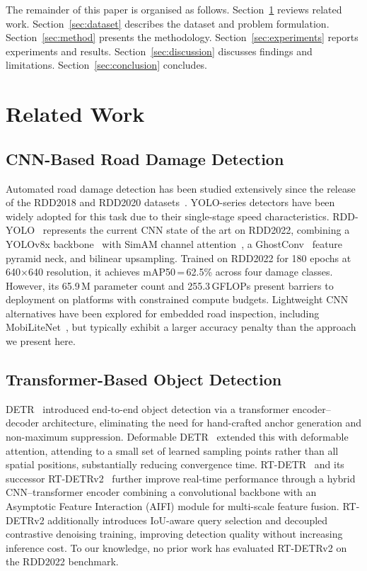 \documentclass[conference]{IEEEtran}
\begin{document}
The remainder of this paper is organised as follows.
Section~\ref{sec:related} reviews related work.
Section~\ref{sec:dataset} describes the dataset and problem formulation.
Section~\ref{sec:method} presents the methodology.
Section~\ref{sec:experiments} reports experiments and results.
Section~\ref{sec:discussion} discusses findings and limitations.
Section~\ref{sec:conclusion} concludes.

\section{Related Work}
\label{sec:related}

\subsection{CNN-Based Road Damage Detection}

Automated road damage detection has been studied extensively since the release of the
RDD2018 and RDD2020 datasets~\cite{maeda2018rdd}.
YOLO-series detectors have been widely adopted for this task due to their
single-stage speed characteristics.
RDD-YOLO~\cite{rddyolo} represents the current CNN state of the art on RDD2022,
combining a YOLOv8x backbone~\cite{jocher2023yolov8} with SimAM channel
attention~\cite{yang2021simam}, a GhostConv~\cite{han2020ghost} feature pyramid neck,
and bilinear upsampling.
Trained on RDD2022 for 180 epochs at 640$\times$640 resolution, it achieves
mAP50\,=\,62.5\% across four damage classes.
However, its 65.9\,M parameter count and 255.3\,GFLOPs present barriers to
deployment on platforms with constrained compute budgets.
Lightweight CNN alternatives have been explored for embedded road inspection,
including MobiLiteNet~\cite{hu2025lightweight}, but typically exhibit a larger
accuracy penalty than the approach we present here.

\subsection{Transformer-Based Object Detection}

DETR~\cite{carion2020detr} introduced end-to-end object detection via a transformer
encoder--decoder architecture, eliminating the need for hand-crafted anchor generation
and non-maximum suppression.
Deformable DETR~\cite{zhu2021deformable} extended this with deformable attention,
attending to a small set of learned sampling points rather than all spatial positions,
substantially reducing convergence time.
RT-DETR~\cite{lyu2023rtdetr} and its successor RT-DETRv2~\cite{chen2024rtdetrv2}
further improve real-time performance through a hybrid CNN--transformer encoder
combining a convolutional backbone with an Asymptotic Feature Interaction (AIFI)
module for multi-scale feature fusion.
RT-DETRv2 additionally introduces IoU-aware query selection and decoupled contrastive
denoising training, improving detection quality without increasing inference cost.
To our knowledge, no prior work has evaluated RT-DETRv2 on the RDD2022 benchmark.
\end{document}
